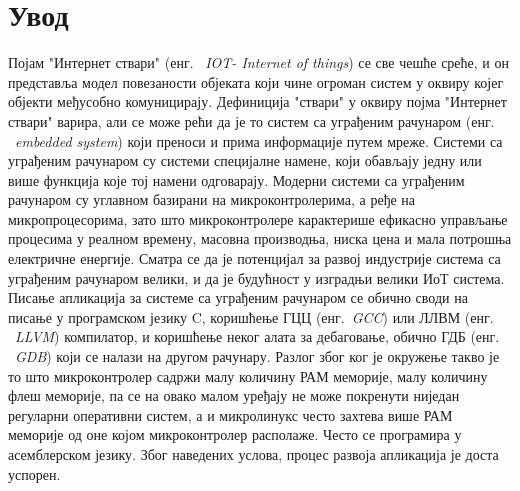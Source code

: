 \documentclass[12pt,oneside]{memoir}
\begin{document}
\frontmatter
\naslovna
\komisija
\apstrakt
\tableofcontents*

\mainmatter

\chapter{Увод}
Појам "Интернет ствари" (енг. ~\textit{IOT- Internet of things}) се све чешће среће, и он представља модел повезаности објеката који чине огроман систем у оквиру којег објекти међусобно комуницирају. Дефиниција "ствари" у оквиру појма "Интернет ствари" варира, али се може рећи да је то систем са уграђеним рачунаром (енг. ~\textit{embedded system}) који преноси и прима информације путем мреже. Системи са уграђеним рачунаром су системи специјалне намене, који обављају једну или више функција које тој намени одговарају. Модерни системи са уграђеним рачунаром су углавном базирани на микроконтролерима, а ређе на микропроцесорима, зато што микроконтролере карактерише ефикасно управљање процесима у реалном времену, масовна производња, ниска цена и мала потрошња електричне енергије. Сматра се да је потенцијал за развој индустрије система са уграђеним рачунаром велики, и да је будућност у изградњи велики ИоТ система.\\

Писање апликација за системе са уграђеним рачунаром се обично своди на писање у програмском језику C, коришћење ГЦЦ (енг.~\textit{GCC}) или ЛЛВМ (енг. ~\textit{LLVM}) компилатор, и коришћење неког алата за дебаговање, обично ГДБ (енг. ~\textit{GDB}) који се налази на другом рачунару. Разлог због ког је окружење такво је то што микроконтролер садржи малу количину РАМ меморије, малу количину флеш меморије, па се на овако малом уређају не може покренути ниједан регуларни оперативни систем, а и микролинукс често захтева више РАМ меморије од оне којом микроконтролер располаже. Често се програмира у асемблерском језику. Због наведених услова, процес развоја апликација је доста успорен. 
\end{document}
